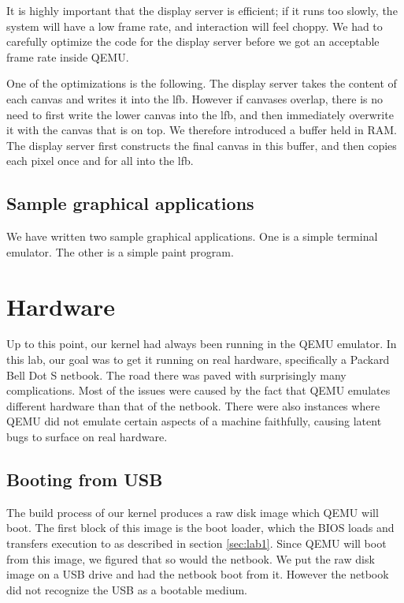 \documentclass{article}
\begin{document}
It is highly important that the display server is efficient; if it runs too
slowly, the system will have a low frame rate, and interaction will feel
choppy. We had to carefully optimize the code for the display server before we
got an acceptable frame rate inside QEMU.

One of the optimizations is the following. The display server takes the
content of each canvas and writes it into the \gls{lfb}. However if
canvases overlap, there is no need to first write the lower canvas into the
\gls{lfb}, and then immediately overwrite it with the canvas that is on top.
We therefore introduced a buffer held in RAM. The display server first
constructs the final canvas in this buffer, and then copies each pixel once
and for all into the \gls{lfb}.



\subsection{Sample graphical applications}
We have written two sample graphical applications. One is a simple terminal
emulator. The other is a simple paint program.




\section{Hardware}
Up to this point, our kernel had always been running in the QEMU emulator. In
this lab, our goal was to get it running on real hardware, specifically a
Packard Bell Dot S netbook. The road there was paved with surprisingly many
complications. Most of the issues were caused by the fact that QEMU emulates
different hardware than that of the netbook. There were also instances where
QEMU did not emulate certain aspects of a machine faithfully, causing latent
bugs to surface on real hardware.


\subsection{Booting from USB}
The build process of our kernel produces a raw disk image which QEMU will
boot. The first block of this image is the boot loader, which the BIOS loads
and transfers execution to as described in section \ref{sec:lab1}. Since QEMU
will boot from this image, we figured that so would the netbook. We put the
raw disk image on a USB drive and had the netbook boot from it. However the
netbook did not recognize the USB as a bootable medium.
\end{document}
